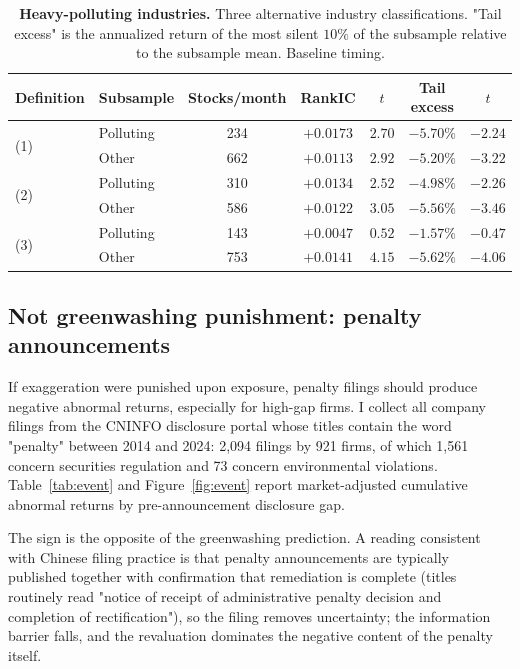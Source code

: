 \documentclass[12pt]{article}
\begin{document}
\begin{table}[t]
\centering\small
\caption{\textbf{Heavy-polluting industries.} Three alternative industry
classifications. "Tail excess" is the annualized return of the most silent
$10\%$ of the subsample relative to the subsample mean. Baseline timing.}
\label{tab:poll}
\vspace{6pt}
\begin{tabular}{llccccc}
\toprule
Definition & Subsample & Stocks/month & RankIC & $t$ & Tail excess & $t$ \\
\midrule
\multirow{2}{*}{(1)} & Polluting & 234 & $+0.0173$ & $2.70$ & $-5.70\%$ & $-2.24$ \\
 & Other & 662 & $+0.0113$ & $2.92$ & $-5.20\%$ & $-3.22$ \\
\multirow{2}{*}{(2)} & Polluting & 310 & $+0.0134$ & $2.52$ & $-4.98\%$ & $-2.26$ \\
 & Other & 586 & $+0.0122$ & $3.05$ & $-5.56\%$ & $-3.46$ \\
\multirow{2}{*}{(3)} & Polluting & 143 & $+0.0047$ & $0.52$ & $-1.57\%$ & $-0.47$ \\
 & Other & 753 & $+0.0141$ & $4.15$ & $-5.62\%$ & $-4.06$ \\
\bottomrule
\end{tabular}
\end{table}

\subsection{Not greenwashing punishment: penalty announcements}
\label{sec:event}
If exaggeration were punished upon exposure, penalty filings should produce
negative abnormal returns, especially for high-gap firms. I collect all company
filings from the CNINFO disclosure portal whose titles contain the word
"penalty" between 2014 and 2024: 2{,}094 filings by 921 firms, of which 1{,}561
concern securities regulation and 73 concern environmental violations.
Table~\ref{tab:event} and Figure~\ref{fig:event} report market-adjusted
cumulative abnormal returns by pre-announcement disclosure gap.

The sign is the opposite of the greenwashing prediction. A reading consistent
with Chinese filing practice is that penalty announcements are typically
published together with confirmation that remediation is complete (titles
routinely read "notice of receipt of administrative penalty decision and
completion of rectification"), so the filing removes uncertainty; the
information barrier falls, and the revaluation dominates the negative content
of the penalty itself.
\end{document}
